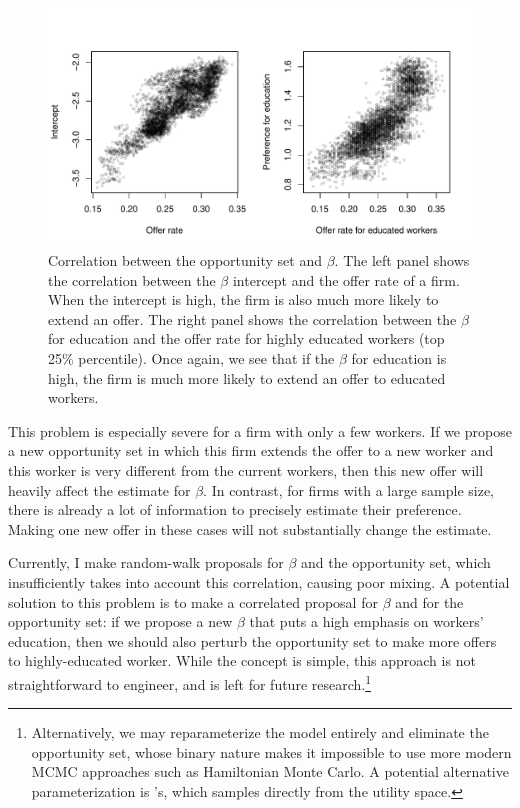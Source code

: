 \begin{figure}[tbp]
  \centering
  \includegraphics[width=\textwidth,keepaspectratio]{../figure/sim_labor_nojobs_opp_beta_correlation_managerial}
  \caption[Correlation between the opportunity set and $\beta$.]{Correlation
    between the opportunity set and $\beta$. The left panel shows the
    correlation between the $\beta$ intercept and the offer rate of a firm. When
  the intercept is high, the firm is also much more likely to extend an offer.
  The right panel shows the correlation between the $\beta$ for education and
  the offer rate for highly educated workers (top 25\% percentile). Once again,
  we see that if the $\beta$ for education is high, the firm is much  more
  likely to extend an offer to educated workers.}
  \label{fig:sim_labor_nojobs_opp_beta_correlation_managerial}
\end{figure}


This problem is especially severe for a firm with only a few workers. If we
propose a new opportunity set in which this firm extends the offer to a new
worker and this worker is very different from the current workers, then this new
offer will heavily affect the estimate for $\beta$. In contrast, for firms with
a large sample size, there is already a lot of information to precisely estimate
their preference. Making one new offer in these cases will not substantially
change the estimate.

Currently, I make random-walk proposals for $\beta$ and the opportunity set,
which insufficiently takes into account this correlation, causing poor mixing. A
potential solution to this problem is to make a correlated proposal for $\beta$
and for the opportunity set: if we propose a new $\beta$ that puts a high
emphasis on workers' education, then we should also perturb the opportunity set
to make more offers to highly-educated worker. While the concept is simple, this
approach is not straightforward to engineer, and is left for future
research.\footnote{Alternatively, we may reparameterize the model entirely and
  eliminate the opportunity set, whose binary nature makes it impossible to use
  more modern MCMC approaches such as Hamiltonian Monte Carlo. A potential
  alternative parameterization is \citet{Logan2008}'s, which samples directly
  from the utility space.}

